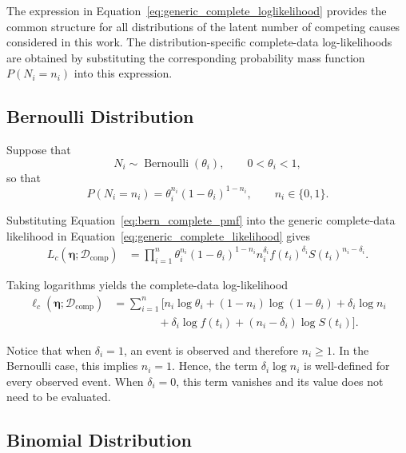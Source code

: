 The expression in Equation~\eqref{eq:generic_complete_loglikelihood}
provides the common structure for all distributions of the latent number
of competing causes considered in this work. The distribution-specific
complete-data log-likelihoods are obtained by substituting the corresponding
probability mass function $P(N_i=n_i)$ into this expression.

\subsection{Bernoulli Distribution}

Suppose that
\begin{equation}
N_i\sim\operatorname{Bernoulli}(\theta_i),
\qquad 0<\theta_i<1,
\end{equation}
so that
\begin{equation}
P(N_i=n_i)
=
\theta_i^{n_i}(1-\theta_i)^{1-n_i},
\qquad n_i\in\{0,1\}.
\label{eq:bern_complete_pmf}
\end{equation}

Substituting Equation~\eqref{eq:bern_complete_pmf} into the generic
complete-data likelihood in Equation~\eqref{eq:generic_complete_likelihood}
gives
\begin{align}
L_c
\left(
\boldsymbol{\eta};
\mathcal{D}_{\mathrm{comp}}
\right)
&=
\prod_{i=1}^n
\theta_i^{n_i}
(1-\theta_i)^{1-n_i}
n_i^{\delta_i}
f(t_i)^{\delta_i}
S(t_i)^{n_i-\delta_i}.
\label{eq:bern_complete_likelihood}
\end{align}

Taking logarithms yields the complete-data log-likelihood
\begin{align}
\ell_c
\left(
\boldsymbol{\eta};
\mathcal{D}_{\mathrm{comp}}
\right)
&=
\sum_{i=1}^n
\Big[
n_i\log\theta_i
+
(1-n_i)\log(1-\theta_i)
+
\delta_i\log n_i
\nonumber\\
&\qquad\qquad
+
\delta_i\log f(t_i)
+
(n_i-\delta_i)\log S(t_i)
\Big].
\label{eq:bern_complete_loglikelihood}
\end{align}

Notice that when $\delta_i=1$, an event is observed and therefore
$n_i\geq1$. In the Bernoulli case, this implies $n_i=1$. Hence, the term
$\delta_i\log n_i$ is well-defined for every observed event. When
$\delta_i=0$, this term vanishes and its value does not need to be
evaluated.

\subsection{Binomial Distribution}

